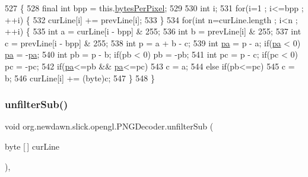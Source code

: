 \begin{DoxyCode}
527                                                                 \{
528         \textcolor{keyword}{final} \textcolor{keywordtype}{int} bpp = this.\mbox{\hyperlink{classorg_1_1newdawn_1_1slick_1_1opengl_1_1_p_n_g_decoder_aa7dcf351689be9279548b306395ee1a8}{bytesPerPixel}};
529         
530         \textcolor{keywordtype}{int} i;
531         \textcolor{keywordflow}{for}(i=1 ; i<=bpp ; ++i) \{
532             curLine[i] += prevLine[i];
533         \}
534         \textcolor{keywordflow}{for}(\textcolor{keywordtype}{int} n=curLine.length ; i<n ; ++i) \{
535             \textcolor{keywordtype}{int} a = curLine[i - bpp] & 255;
536             \textcolor{keywordtype}{int} b = prevLine[i] & 255;
537             \textcolor{keywordtype}{int} c = prevLine[i - bpp] & 255;
538             \textcolor{keywordtype}{int} p = a + b - c;
539             \textcolor{keywordtype}{int} \mbox{\hyperlink{namespacepa}{pa}} = p - a; \textcolor{keywordflow}{if}(\mbox{\hyperlink{namespacepa}{pa}} < 0) \mbox{\hyperlink{namespacepa}{pa}} = -\mbox{\hyperlink{namespacepa}{pa}};
540             \textcolor{keywordtype}{int} pb = p - b; \textcolor{keywordflow}{if}(pb < 0) pb = -pb;
541             \textcolor{keywordtype}{int} pc = p - c; \textcolor{keywordflow}{if}(pc < 0) pc = -pc;
542             \textcolor{keywordflow}{if}(\mbox{\hyperlink{namespacepa}{pa}}<=pb && \mbox{\hyperlink{namespacepa}{pa}}<=pc)
543                 c = a;
544             \textcolor{keywordflow}{else} \textcolor{keywordflow}{if}(pb<=pc)
545                 c = b;
546             curLine[i] += (byte)c;
547         \}
548     \}
\end{DoxyCode}
\mbox{\label{classorg_1_1newdawn_1_1slick_1_1opengl_1_1_p_n_g_decoder_a1939d148e672836c11da54bc8edf16fe}} 
\subsubsection{\texorpdfstring{unfilter\+Sub()}{unfilterSub()}}
{\footnotesize\ttfamily void org.\+newdawn.\+slick.\+opengl.\+P\+N\+G\+Decoder.\+unfilter\+Sub (\begin{DoxyParamCaption}\item[{byte \mbox{[}$\,$\mbox{]}}]{cur\+Line }\end{DoxyParamCaption})\hspace{0.3cm}{\ttfamily [inline]}, {\ttfamily [private]}}


